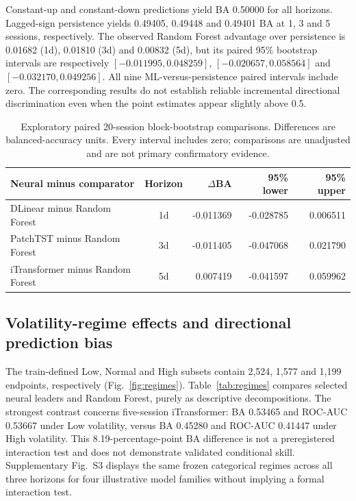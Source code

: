 \documentclass[fleqn,10pt]{wlscirep}
\begin{document}
Constant-up and constant-down predictions yield BA 0.50000 for all horizons. Lagged-sign persistence yields 0.49405, 0.49448 and 0.49401 BA at 1, 3 and 5 sessions, respectively. The observed Random Forest advantage over persistence is 0.01682 (1d), 0.01810 (3d) and 0.00832 (5d), but its paired 95\% bootstrap intervals are respectively $[-0.011995,0.048259]$, $[-0.020657,0.058564]$ and $[-0.032170,0.049256]$. All nine ML-versus-persistence paired intervals include zero. The corresponding results do not establish reliable incremental directional discrimination even when the point estimates appear slightly above 0.5.

\begin{table}[htbp]\centering\small
\caption{Exploratory paired 20-session block-bootstrap comparisons. Differences are balanced-accuracy units. Every interval includes zero; comparisons are unadjusted and are not primary confirmatory evidence.}\label{tab:paired}
\begin{tabular}{@{}lcrrr@{}}\toprule
Neural minus comparator & Horizon & $\Delta$BA & 95\% lower & 95\% upper \\ \midrule
DLinear minus Random Forest & 1d & -0.011369 & -0.028785 & 0.006511 \\
PatchTST minus Random Forest & 3d & -0.011405 & -0.047068 & 0.021790 \\
iTransformer minus Random Forest & 5d & 0.007419 & -0.041597 & 0.059962 \\
\bottomrule\end{tabular}
\end{table}

\subsection{Volatility-regime effects and directional prediction bias}
The train-defined Low, Normal and High subsets contain 2,524, 1,577 and 1,199 endpoints, respectively (Fig.~\ref{fig:regimes}). Table~\ref{tab:regimes} compares selected neural leaders and Random Forest, purely as descriptive decompositions. The strongest contrast concerns five-session iTransformer: BA 0.53465 and ROC-AUC 0.53667 under Low volatility, versus BA 0.45280 and ROC-AUC 0.41447 under High volatility. This 8.19-percentage-point BA difference is not a preregistered interaction test and does not demonstrate validated conditional skill. Supplementary Fig.~S3 displays the same frozen categorical regimes across all three horizons for four illustrative model families without implying a formal interaction test.
\end{document}
